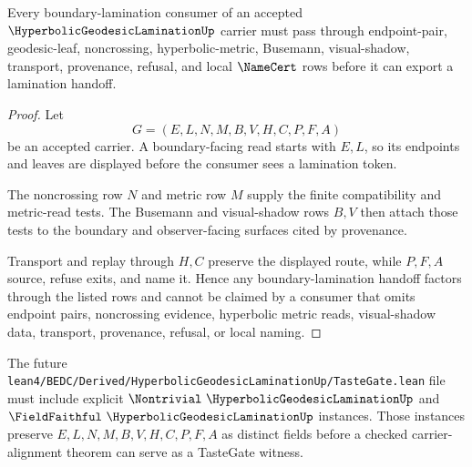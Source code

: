 \begin{theorem}
\label{thm:hyperbolic-geodesic-lamination-boundary-route}
Every boundary-lamination consumer of an accepted $\HyperbolicGeodesicLaminationUp$ carrier must pass through endpoint-pair, geodesic-leaf, noncrossing, hyperbolic-metric, Busemann, visual-shadow, transport, provenance, refusal, and local $\NameCert$ rows before it can export a lamination handoff.
\end{theorem}
\begin{proof}
Let
$$
G=(E,L,N,M,B,V,H,C,P,F,A)
$$
be an accepted carrier. A boundary-facing read starts with $E,L$, so its endpoints and leaves are displayed before the consumer sees a lamination token.

The noncrossing row $N$ and metric row $M$ supply the finite compatibility and metric-read tests. The Busemann and visual-shadow rows $B,V$ then attach those tests to the boundary and observer-facing surfaces cited by provenance.

Transport and replay through $H,C$ preserve the displayed route, while $P,F,A$ source, refuse exits, and name it. Hence any boundary-lamination handoff factors through the listed rows and cannot be claimed by a consumer that omits endpoint pairs, noncrossing evidence, hyperbolic metric reads, visual-shadow data, transport, provenance, refusal, or local naming.
\end{proof}



The future \texttt{lean4/BEDC/Derived/HyperbolicGeodesicLaminationUp/TasteGate.lean} file must include explicit $\Nontrivial\ \HyperbolicGeodesicLaminationUp$ and $\FieldFaithful\ \HyperbolicGeodesicLaminationUp$ instances. Those instances preserve $E,L,N,M,B,V,H,C,P,F,A$ as distinct fields before a checked carrier-alignment theorem can serve as a TasteGate witness.

